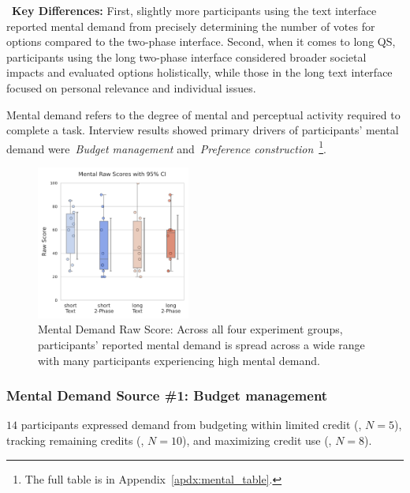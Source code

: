 \begin{tldrbox}
   \faKey~\textbf{Key Differences:} First, slightly more participants using the text interface reported mental demand from precisely determining the number of votes for options compared to the two-phase interface. Second, when it comes to long QS, participants using the long two-phase interface considered broader societal impacts and evaluated options holistically, while those in the long text interface focused on personal relevance and individual issues. %
\end{tldrbox}

Mental demand refers to the degree of mental and perceptual activity required to complete a task. Interview results showed primary drivers of participants' mental demand were~\textit{Budget management} and~\textit{Preference construction}~\footnote{The full table is in Appendix~\ref{apdx:mental_table}.}. %

\begin{figure} %
   \centering
    \includegraphics[width=0.45\textwidth, trim=0 13 0 13, clip]{content/image/cog/Mental_scores.pdf}
    \captionsetup{width=0.4\textwidth, justification=justified}
    \caption{Mental Demand Raw Score: Across all four experiment groups, participants' reported mental demand is spread across a wide range with many participants experiencing high mental demand.}
    \label{fig:mental_cog_score}
\end{figure}

\subsubsection{Mental Demand Source \#1: Budget management} $14$ participants expressed demand from budgeting within limited credit (, $N=5$), tracking remaining credits (, $N=10$), and maximizing credit use (, $N=8$).

